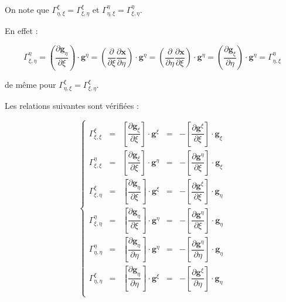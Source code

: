 \begin{remarque}
On note que $\Gamma_{\eta,\xi}^{\xi}=\Gamma_{\xi,\eta}^{\xi}$ et $\Gamma_{\eta,\xi}^{\eta}=\Gamma_{\xi,\eta}^{\eta}$.

En effet :

$$\Gamma_{\xi, \eta}^{\eta} = \left( \dfrac{\partial \mathbf{g}_{\eta}}{\partial \xi} \right) \cdot \mathbf{g}^{\eta} = \left( \dfrac{\partial}{\partial \xi} \dfrac{\partial \mathbf{x}}{\partial \eta} \right) \cdot \mathbf{g}^{\eta} = \left( \dfrac{\partial}{\partial \eta} \dfrac{\partial \mathbf{x}}{\partial \xi} \right) \cdot \mathbf{g}^{\eta} = \left( \dfrac{\partial \mathbf{g}_{\xi}}{\partial \eta} \right) \cdot \mathbf{g}^{\eta} = \Gamma_{\eta, \xi}^{\eta}$$

de même pour $\Gamma_{\eta,\xi}^{\xi}=\Gamma_{\xi,\eta}^{\xi}$.
\end{remarque}

\begin{proposition}
Les relations suivantes sont vérifiées :

\begin{equation}
\left\lbrace
\begin{array}{rcccl}
\Gamma_{\xi,\xi}^{\xi} & = & \left[ \dfrac{\partial \mathbf{g}_{\xi}}{\partial \xi} \right] \cdot \mathbf{g}^{\xi} & = & - \left[ \dfrac{\partial \mathbf{g}^{\xi}}{\partial \xi} \right] \cdot \mathbf{g}_ {\xi}\\

\Gamma_{\xi,\xi}^{\eta} & = & \left[ \dfrac{\partial \mathbf{g}_{\xi}}{\partial \xi} \right] \cdot \mathbf{g}^{\eta} & = & - \left[ \dfrac{\partial \mathbf{g}^{\eta}}{\partial \xi} \right] \cdot \mathbf{g}_ {\xi}\\

\Gamma_{\xi,\eta}^{\xi} & = & \left[ \dfrac{\partial \mathbf{g}_{\eta}}{\partial \xi} \right] \cdot \mathbf{g}^{\xi} & = & - \left[ \dfrac{\partial \mathbf{g}^{\xi}}{\partial \xi} \right] \cdot \mathbf{g}_ {\eta}\\

\Gamma_{\xi,\eta}^{\eta} & = & \left[ \dfrac{\partial \mathbf{g}_{\eta}}{\partial \xi} \right] \cdot \mathbf{g}^{\eta} & = & - \left[ \dfrac{\partial \mathbf{g}^{\eta}}{\partial \xi} \right] \cdot \mathbf{g}_ {\eta}\\

\Gamma_{\eta,\eta}^{\eta} & = & \left[ \dfrac{\partial \mathbf{g}_{\eta}}{\partial \eta} \right] \cdot \mathbf{g}^{\eta} & = & - \left[ \dfrac{\partial \mathbf{g}^{\eta}}{\partial \eta} \right] \cdot \mathbf{g}_ {\eta}\\

\Gamma_{\eta,\eta}^{\xi} & = & \left[ \dfrac{\partial \mathbf{g}_{\eta}}{\partial \eta} \right] \cdot \mathbf{g}^{\xi} & = & - \left[ \dfrac{\partial \mathbf{g}^{\xi}}{\partial \eta} \right] \cdot \mathbf{g}_ {\eta}\\
\end{array}
\right.
\end{equation}
\end{proposition}

